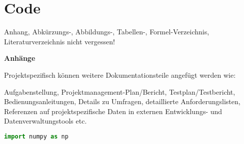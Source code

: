 % 
\chapter{Code}
\label{ch:Code}
Anhang, Abkürzungs-, Abbildungs-, Tabellen-, Formel-Verzeichnis, Literaturverzeichnis nicht vergessen!\par
\textbf{Anhänge}

Projektspezifisch können weitere Dokumentationsteile angefügt werden wie:

Aufgabenstellung, Projektmanagement-Plan/Bericht, Testplan/Testbericht, Bedienungsanleitungen, Details zu Umfragen, detaillierte Anforderungslisten, Referenzen auf projektspezifische Daten in externen Entwicklungs- und Datenverwaltungstools etc.
\begin{lstlisting}[caption={Caption on PDF}, label={lst:reference_this}, language=Python]
import numpy as np
\end{lstlisting}